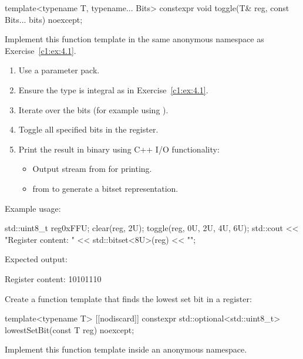 \begin{cppcode}
template<typename T, typename... Bits>
constexpr void toggle(T& reg, const Bits... bits) noexcept;
\end{cppcode}

\noindent Implement this function template in the same anonymous namespace as
Exercise~\ref{c1:ex:4.1}.

\begin{enumerate}
  \item Use a parameter pack.
  \item Ensure the type is integral as in Exercise~\ref{c1:ex:4.1}.
  \item Iterate over the bits (for example using ).
  \item Toggle all specified bits in the register.
  \item Print the result in binary using C++ I/O functionality:
  \begin{itemize}
    \item Output stream  from  for printing.
    \item {} from  to generate a bitset representation.
  \end{itemize}
\end{enumerate}
Example usage:

\begin{cppcode}
std::uint8_t reg{0xFFU};
clear(reg, 2U);
toggle(reg, 0U, 2U, 4U, 6U);
std::cout << "Register content: " << std::bitset<8U>(reg) << "\n";
\end{cppcode}

\noindent Expected output:

\begin{console}
Register content: 10101110
\end{console}

\label{c1:set:5}

\label{c1:ex:5.1}
Create a function template that finds the lowest set bit in a register:

\begin{cppcode}
template<typename T>
[[nodiscard]] constexpr std::optional<std::uint8_t> lowestSetBit(const T reg) noexcept;
\end{cppcode}

\noindent Implement this function template inside an anonymous namespace.


